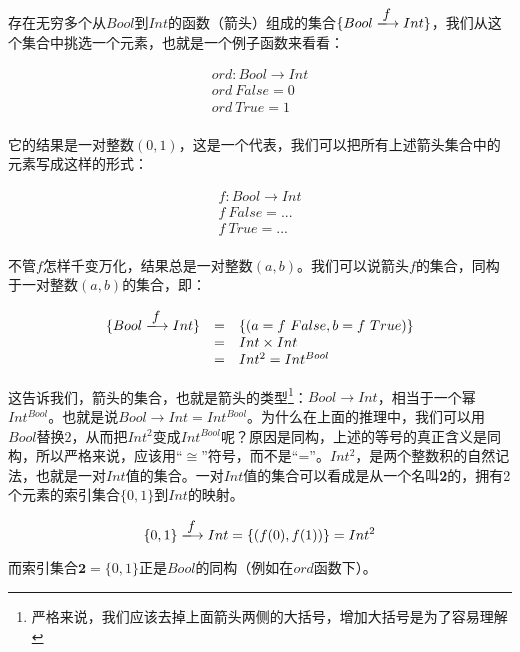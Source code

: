 \documentclass{article}
\begin{document}
\begin{example}
存在无穷多个从$Bool$到$Int$的函数（箭头）组成的集合$\{Bool \arrowto{f} Int\}$，我们从这个集合中挑选一个元素，也就是一个例子函数来看看：

\[
\begin{array}{l}
ord : Bool \to Int \\
ord\ False = 0 \\
ord\ True = 1 \\
\end{array}
\]

它的结果是一对整数$(0, 1)$，这是一个代表，我们可以把所有上述箭头集合中的元素写成这样的形式：

\[
\begin{array}{l}
f : Bool \to Int \\
f\ False = ... \\
f\ True = ... \\
\end{array}
\]

不管$f$怎样千变万化，结果总是一对整数$(a, b)$。我们可以说箭头$f$的集合，同构于一对整数$(a, b)$的集合，即：

\[
\begin{array}{rcl}
\{Bool \arrowto{f} Int\} & = & \{(a = f\ False, b = f\ True)\} \\
  & = & Int \times Int \\
  & = & Int^2 = Int^{Bool}
\end{array}
\]

这告诉我们，箭头的集合，也就是箭头的类型\footnote{严格来说，我们应该去掉上面箭头两侧的大括号，增加大括号是为了容易理解}：$Bool \to Int$，相当于一个幂$Int^{Bool}$。也就是说$Bool \to Int = Int^{Bool}$。为什么在上面的推理中，我们可以用$Bool$替换$2$，从而把$Int^2$变成$Int^{Bool}$呢？原因是同构，上述的等号的真正含义是同构，所以严格来说，应该用“$\cong$”符号，而不是“=”。$Int^2$，是两个整数积的自然记法，也就是一对$Int$值的集合。一对$Int$值的集合可以看成是从一个名叫\textbf{2}的，拥有2个元素的索引集合$\{0, 1\}$到$Int$的映射。

\[
\{0, 1\} \arrowto{f} Int = \{(f(0), f(1))\} = Int^2
\]

而索引集合$\mathbf{2} = \{0, 1\}$正是$Bool$的同构（例如在$ord$函数下）。
\end{example}
\end{document}
